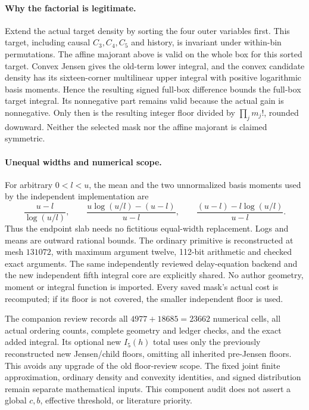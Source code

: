 \paragraph{Why the factorial is legitimate.}
Extend the actual target density by sorting the four outer variables
first.  This target, including causal $C_3,C_4,C_5$ and history, is
invariant under within-bin permutations.  The affine majorant above
is valid on the whole box for this sorted target.  Convex Jensen gives
the old-term lower integral, and the convex candidate density has its
sixteen-corner multilinear upper integral with positive logarithmic
basis moments.  Hence the resulting signed full-box difference bounds
the full-box target integral.  Its nonnegative part remains valid
because the actual gain is nonnegative.  Only then is the resulting
integer floor divided by $\prod_j m_j!$, rounded downward.  Neither
the selected mask nor the affine majorant is claimed symmetric.

\paragraph{Unequal widths and numerical scope.}
For arbitrary $0<l<u$, the mean and the two unnormalized basis moments
used by the independent implementation are
\[
 \frac{u-l}{\log(u/l)},\qquad
 \frac{u\log(u/l)-(u-l)}{u-l},\qquad
 \frac{(u-l)-l\log(u/l)}{u-l}.
\]
Thus the endpoint slab needs no fictitious equal-width replacement.
Logs and means are outward rational bounds.  The ordinary primitive
is reconstructed at mesh $131072$, with maximum argument twelve,
112-bit arithmetic and checked exact arguments.  The same independently
reviewed delay-equation backend and the new independent fifth integral
core are explicitly shared.  No author geometry, moment or integral
function is imported.  Every saved mask's actual cost is recomputed;
if its floor is not covered, the smaller independent floor is used.

The companion review records all $4977+18685=23662$ numerical cells,
all actual ordering counts, complete geometry and ledger checks, and
the exact added integral.  Its optional new $I_5(h)$ total uses only
the previously reconstructed new Jensen/child floors, omitting all
inherited pre-Jensen floors.  This avoids any upgrade of the old
floor-review scope.  The fixed joint finite approximation, ordinary
density and convexity identities, and signed distribution remain
separate mathematical inputs.  This component audit does not assert
a global $c,b$, effective threshold, or literature priority.
